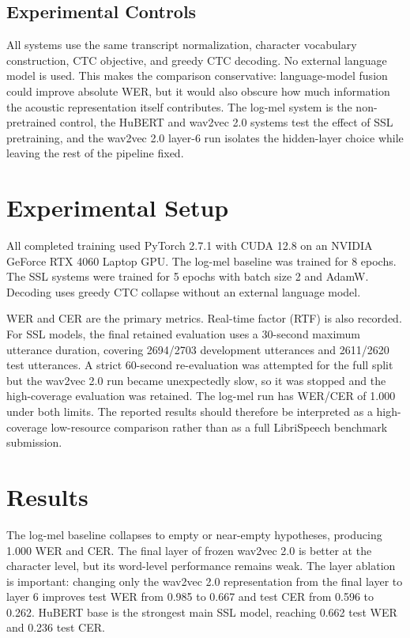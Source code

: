 \documentclass{article}
\begin{document}
\subsection{Experimental Controls}

All systems use the same transcript normalization, character vocabulary
construction, CTC objective, and greedy CTC decoding. No external language
model is used. This makes the comparison conservative: language-model fusion
could improve absolute WER, but it would also obscure how much information the
acoustic representation itself contributes. The log-mel system is the
non-pretrained control, the HuBERT and wav2vec 2.0 systems test the effect of
SSL pretraining, and the wav2vec 2.0 layer-6 run isolates the hidden-layer
choice while leaving the rest of the pipeline fixed.

\section{Experimental Setup}

All completed training used PyTorch 2.7.1 with CUDA 12.8 on an NVIDIA GeForce
RTX 4060 Laptop GPU. The log-mel baseline was trained for 8 epochs. The SSL
systems were trained for 5 epochs with batch size 2 and AdamW. Decoding uses
greedy CTC collapse without an external language model.

WER and CER are the primary metrics. Real-time factor (RTF) is also recorded.
For SSL models, the final retained evaluation uses a 30-second maximum utterance
duration, covering 2694/2703 development utterances and 2611/2620 test
utterances. A strict 60-second re-evaluation was attempted for the full split
but the wav2vec 2.0 run became unexpectedly slow, so it was stopped and the
high-coverage evaluation was retained. The log-mel run has WER/CER of 1.000
under both limits. The reported results should therefore be interpreted as a
high-coverage low-resource comparison rather than as a full LibriSpeech
benchmark submission.

\section{Results}



The log-mel baseline collapses to empty or near-empty hypotheses, producing
1.000 WER and CER. The final layer of frozen wav2vec 2.0 is better at the
character level, but its word-level performance remains weak. The layer
ablation is important: changing only the wav2vec 2.0 representation from the
final layer to layer 6 improves test WER from 0.985 to 0.667 and test CER from
0.596 to 0.262. HuBERT base is the strongest main SSL model, reaching 0.662
test WER and 0.236 test CER.
\end{document}

